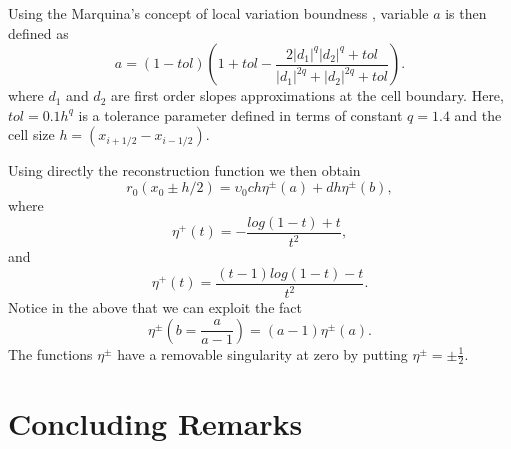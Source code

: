 \documentclass[10pt,a4paper]{article}
\begin{document}
Using the Marquina's concept of local variation boundness \citep{Artebrant2006}, variable $a$ is then defined as
%
\begin{equation}
	a = (1-tol)\left( 1+tol-\frac{2|d_1|^{q}|d_2|^{q}+tol}{|d_1|^{2q}+|d_2|^{2q}+tol} \right).
\end{equation}
%
where $d_1$ and $d_2$ are first order slopes approximations at the cell boundary. Here, $tol=0.1 h^q$ is a tolerance parameter defined in terms of constant $q=1.4$ and the cell size $h=(x_{i+1/2}-x_{i-1/2})$.


Using directly the reconstruction function we then obtain
%
\begin{equation}
	r_0(x_0\pm h/2) = \upsilon_0 ch\eta^{\pm}(a) + dh\eta^{\pm}(b),
\end{equation}
%
where
%
\begin{equation}
	\eta^{+}(t) = -\frac{log(1-t)+t}{t^2},
\end{equation}
%
and
%
\begin{equation}
	\eta^{+}(t) = \frac{(t-1)log(1-t)-t}{t^2}.
\end{equation}
%
Notice in the above that we can exploit the fact 
%
\begin{equation}
	\eta^{\pm} \left( b=\frac{a}{a-1}\right) = (a-1)\eta^{\pm}(a).
\end{equation}
%
The functions $\eta^{\pm}$ have a removable singularity at zero by putting $\eta^{\pm} = \pm \frac{1}{2}$. 
 
\section{Concluding Remarks}
\label{sec:Conclusions}


 
\end{document}
